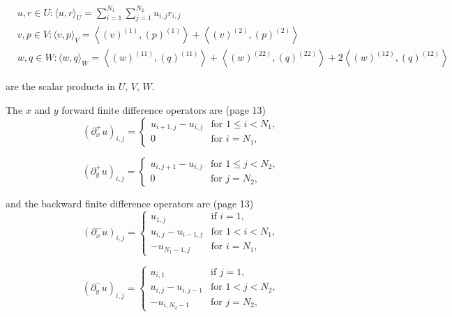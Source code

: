 \documentclass{article}
\begin{document}
\begin{equation}
\begin{aligned}
    & u, r \in U:\langle u, r\rangle_U = \sum_{i=1}^{N_1} \sum_{j=1}^{N_2} u_{i,j} r_{i,j} \\
    & v, p \in V:\langle v, p\rangle_V=\left\langle\left(v\right)^{(1)},\left(p\right)^{(1)}\right\rangle+\left\langle\left(v\right)^{(2)},\left(p\right)^{(2)}\right\rangle \\
    & w, q \in W:\langle w, q\rangle_W=\left\langle\left(w\right)^{(11)},\left(q\right)^{(11)}\right\rangle+\left\langle\left(w\right)^{(22)},\left(q\right)^{(22)}\right\rangle+2\left\langle\left(w\right)^{(12)},\left(q\right)^{(12)}\right\rangle
\end{aligned}
\end{equation}

are the scalar products in $U$, $V$, $W$.
\newline


The $x$ and $y$ forward finite difference operators are (page 13)
\begin{equation}
(\partial_x^+ u)_{i,j} =
\begin{cases}
u_{i+1,j} - u_{i,j} & \text{for } 1 \leq i < N_1, \\
0 & \text{for } i = N_1,
\end{cases}
\end{equation}

\begin{equation}
(\partial_y^+ u)_{i,j} =
\begin{cases}
u_{i,j+1} - u_{i,j} & \text{for } 1 \leq j < N_2, \\
0 & \text{for } j = N_2,
\end{cases}
\end{equation}

and the backward finite difference operators are (page 13)
\begin{equation}
    (\partial_x^- u)_{i,j} = 
    \begin{cases}
    u_{1,j} & \text{if } i = 1, \\
    u_{i,j} - u_{i-1,j} & \text{for } 1 < i < N_1, \\
    -u_{N_1-1,j} & \text{for } i = N_1,
    \end{cases}
\end{equation}
    
\begin{equation}
    (\partial_y^- u)_{i,j} = 
    \begin{cases}
    u_{i,1} & \text{if } j = 1, \\
    u_{i,j} - u_{i,j-1} & \text{for } 1 < j < N_2, \\
    -u_{i,N_2-1} & \text{for } j = N_2,
    \end{cases}
\end{equation}
\end{document}
